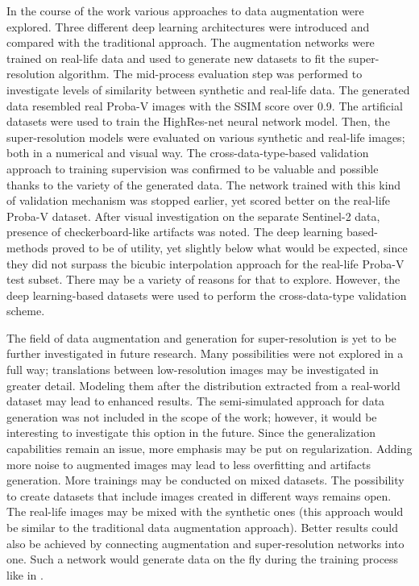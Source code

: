 In the course of the work various approaches to data augmentation were explored.
Three different deep learning architectures were introduced and compared with the traditional approach.
The augmentation networks were trained on real-life data and used to generate new datasets to fit the super-resolution algorithm.
The mid-process evaluation step was performed to investigate levels of similarity between synthetic and real-life data.
The generated data resembled real Proba-V images with the SSIM score over 0.9.
The artificial datasets were used to train the HighRes-net neural network model.
Then, the super-resolution models were evaluated on various synthetic and real-life images; both in a numerical and visual way.
The cross-data-type-based validation approach to training supervision was confirmed to be valuable and possible thanks to the variety of the generated data.
The network trained with this kind of validation mechanism was stopped earlier, yet scored better on the real-life Proba-V dataset.
After visual investigation on the separate Sentinel-2 data, presence of checkerboard-like artifacts was noted.
The deep learning based-methods proved to be of utility, yet slightly below what would be expected, since they did not surpass the bicubic interpolation approach for the real-life Proba-V test subset.
There may be a variety of reasons for that to explore.
However, the deep learning-based datasets were used to perform the cross-data-type validation scheme.

The field of data augmentation and generation for super-resolution is yet to be further investigated in future research.
Many possibilities were not explored in a full way; translations between low-resolution images may be investigated in greater detail.
Modeling them after the distribution extracted from a real-world dataset may lead to enhanced results.
The semi-simulated approach for data generation was not included in the scope of the work; however, it would be interesting to investigate this option in the future.
Since the generalization capabilities remain an issue, more emphasis may be put on regularization.
Adding more noise to augmented images may lead to less overfitting and artifacts generation.
More trainings may be conducted on mixed datasets. 
The possibility to create datasets that include images created in different ways remains open.
The real-life images may be mixed with the synthetic ones (this approach would be similar to the traditional data augmentation approach).
Better results could also be achieved by connecting augmentation and super-resolution networks into one.
Such a network would generate data on the fly during the training process like in \cite{bulat-2018-supergan}.

